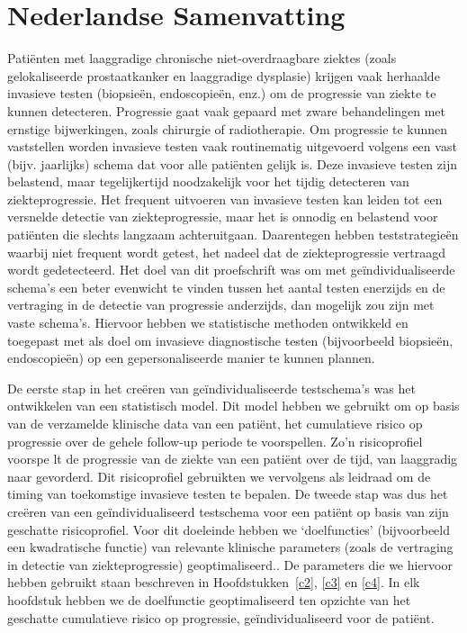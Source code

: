 \section{Nederlandse Samenvatting}
Patiënten met laaggradige chronische niet-overdraagbare ziektes (zoals gelokaliseerde prostaatkanker en laaggradige dysplasie) krijgen vaak herhaalde invasieve testen (biopsieën, endoscopieën, enz.) om de progressie van ziekte te kunnen detecteren. Progressie gaat vaak gepaard met zware behandelingen met ernstige bijwerkingen, zoals chirurgie of radiotherapie. Om progressie te kunnen vaststellen worden invasieve testen vaak routinematig uitgevoerd volgens een vast (bijv. jaarlijks) schema dat voor alle patiënten gelijk is. Deze invasieve testen zijn belastend, maar tegelijkertijd noodzakelijk voor het tijdig detecteren van ziekteprogressie. Het frequent uitvoeren van invasieve testen kan leiden tot een versnelde detectie van ziekteprogressie, maar het is onnodig en belastend voor patiënten die slechts langzaam achteruitgaan. Daarentegen hebben teststrategieën waarbij niet frequent wordt getest, het nadeel dat de ziekteprogressie vertraagd wordt gedetecteerd. Het doel van dit proefschrift was om met geïndividualiseerde schema’s een beter evenwicht te vinden tussen het aantal testen enerzijds en de vertraging in de detectie van progressie anderzijds, dan mogelijk zou zijn met vaste schema's. Hiervoor hebben we statistische methoden ontwikkeld en toegepast met als doel om invasieve diagnostische testen (bijvoorbeeld biopsieën, endoscopieën) op een gepersonaliseerde manier te kunnen plannen. 

De eerste stap in het creëren van geïndividualiseerde testschema's was het ontwikkelen van een statistisch model. Dit model hebben we gebruikt om op basis van de verzamelde klinische data van een patiënt, het cumulatieve risico op progressie over de gehele follow-up periode te voorspellen. Zo’n risicoprofiel voorspe lt de progressie van de ziekte van een patiënt over de tijd, van laaggradig naar gevorderd. Dit risicoprofiel gebruikten we vervolgens als leidraad om de timing van toekomstige invasieve testen te bepalen. De tweede stap was dus het creëren van een geïndividualiseerd testschema voor een patiënt op basis van zijn geschatte risicoprofiel. Voor dit doeleinde hebben we ‘doelfuncties’ (bijvoorbeeld een kwadratische functie) van relevante klinische parameters (zoals de vertraging in detectie van ziekteprogressie) geoptimaliseerd.. De parameters die we hiervoor hebben gebruikt staan beschreven in Hoofdstukken~\ref{c2}, \ref{c3} en \ref{c4}. In elk hoofdstuk hebben we de doelfunctie geoptimaliseerd ten opzichte van het geschatte cumulatieve risico op progressie, geïndividualiseerd voor de patiënt.

